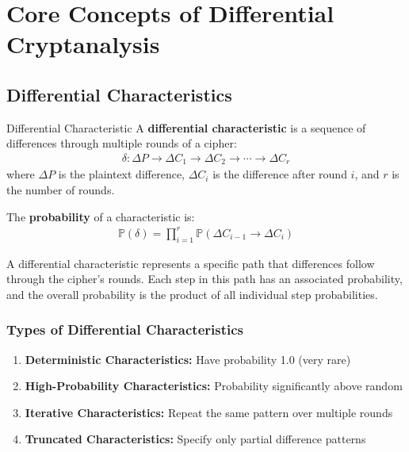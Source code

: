\documentclass[12pt,a4paper]{article}
\theoremstyle{definition}
\newcommand{\diff}{\Delta}
\newcommand{\prob}{\mathbb{P}}
\newcommand{\diffchar}{\delta}
\begin{document}
\section{Core Concepts of Differential Cryptanalysis}

\subsection{Differential Characteristics}

\begin{definitionbox}{Differential Characteristic}
A \textbf{differential characteristic} is a sequence of differences through multiple rounds of a cipher:
\begin{align}
\diffchar: \diff P \rightarrow \diff C_1 \rightarrow \diff C_2 \rightarrow \cdots \rightarrow \diff C_r
\end{align}
where $\diff P$ is the plaintext difference, $\diff C_i$ is the difference after round $i$, and $r$ is the number of rounds.

The \textbf{probability} of a characteristic is:
\begin{align}
\prob(\diffchar) = \prod_{i=1}^{r} \prob(\diff C_{i-1} \rightarrow \diff C_i)
\end{align}
\end{definitionbox}

A differential characteristic represents a specific path that differences follow through the cipher's rounds. Each step in this path has an associated probability, and the overall probability is the product of all individual step probabilities.

\subsubsection{Types of Differential Characteristics}

\begin{enumerate}
    \item \textbf{Deterministic Characteristics:} Have probability 1.0 (very rare)
    \item \textbf{High-Probability Characteristics:} Probability significantly above random
    \item \textbf{Iterative Characteristics:} Repeat the same pattern over multiple rounds
    \item \textbf{Truncated Characteristics:} Specify only partial difference patterns
\end{enumerate}
\end{document}
